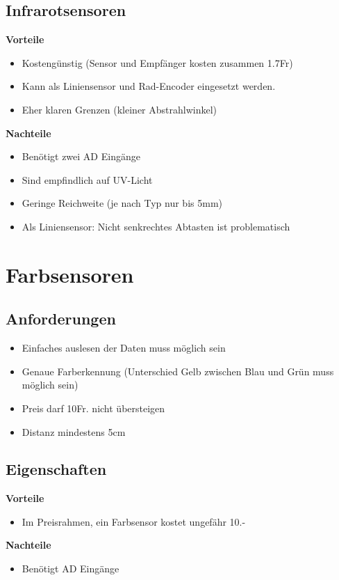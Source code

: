 \subsection{Infrarotsensoren}
\textbf {Vorteile}
\begin{itemize}
\item Kostengünstig (Sensor und Empfänger kosten zusammen 1.7Fr)
\item Kann als Liniensensor und Rad-Encoder eingesetzt werden.
\item Eher klaren Grenzen (kleiner Abstrahlwinkel)\\
\end{itemize}
\textbf {Nachteile}
\begin{itemize}
\item Benötigt zwei AD Eingänge
\item Sind empfindlich auf UV-Licht
\item Geringe Reichweite (je nach Typ nur bis 5mm)
\item Als Liniensensor: Nicht senkrechtes Abtasten ist problematisch
\end{itemize}


\section{Farbsensoren}
\subsection{Anforderungen}
\begin{itemize}
\item Einfaches auslesen der Daten muss möglich sein
\item Genaue Farberkennung (Unterschied Gelb zwischen Blau und Grün muss möglich sein)
\item Preis darf 10Fr. nicht übersteigen
\item Distanz mindestens 5cm
\end{itemize}

\subsection{Eigenschaften}

\textbf {Vorteile}
\begin{itemize}
\item Im Preisrahmen, ein Farbsensor kostet ungefähr 10.-
\end{itemize}
\textbf {Nachteile}
\begin{itemize}
\item Benötigt  AD Eingänge

\end{itemize}